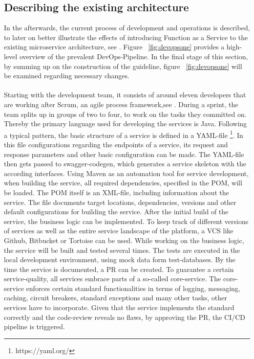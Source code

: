 \documentclass[11pt]{article}
\begin{document}
\subsection{Describing the existing architecture}
In the afterwards, the current process of development and operations is described, to later on better illustrate the effects of introducing Function as a Service to the existing microservice architecture, see \cite{newman2015building}. Figure ~\ref{fig:devopsone} provides a high-level overview of the prevalent DevOps-Pipeline. In the final stage of this section, by summing up on the construction of the guideline, figure ~\ref{fig:devopsone} will be examined regarding necessary changes.\\\\ Starting with the development team, it consists of around eleven developers that are working after Scrum, an agile process framework,see \cite{pichler2013scrum}. During a sprint, the team splits up in groups of two to four, to work on the tasks they committed on. Thereby the primary language used for developing the services is Java. Following a typical pattern, the basic structure of a service is defined in a YAML-file \footnote{https://yaml.org/}. In this file configurations regarding the endpoints of a service, its request and response parameters and other basic configuration can be made. The YAML-file then gets passed to swagger-codegen, which generates a service skeleton with the according interfaces. Using Maven as an automation tool for service development, when building the service, all required dependencies, specified in the POM, will be loaded. The POM itself is an XML-file, including information about the service. The file documents target locations, dependencies, versions and other default configurations for building the service. After the initial build of the service, the business logic can be implemented. To keep track of different versions of services as well as the entire service landscape of the platform, a VCS like Github, Bitbucket or Tortoise can be used. While working on the business logic, the service will be built and tested several times. The tests are executed in the local development environment, using mock data form test-databases. By the time the service is documented, a PR can be created. To guarantee a certain service-quality, all services embrace parts of a so-called core-service. The core-service enforces certain standard functionalities in terms of logging, messaging, caching, circuit breakers, standard exceptions and many other tasks, other services have to incorporate. Given that the service implements the standard correctly and the code-review reveals no flaws, by approving the PR, the CI/CD pipeline is triggered.     
\end{document}
